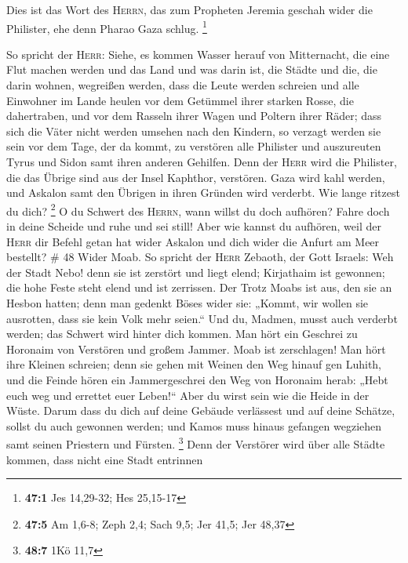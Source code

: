  Dies ist das Wort des \textsc{Herrn}, das zum Propheten
Jeremia geschah wider die Philister, ehe denn Pharao Gaza schlug.
\footnote{\textbf{47:1} Jes 14,29-32; Hes 25,15-17}

 So spricht der \textsc{Herr}: Siehe, es kommen Wasser
herauf von Mitternacht, die eine Flut machen werden und das Land und was
darin ist, die Städte und die, die darin wohnen, wegreißen werden, dass
die Leute werden schreien und alle Einwohner im Lande heulen
 vor dem Getümmel ihrer starken Rosse, die dahertraben,
und vor dem Rasseln ihrer Wagen und Poltern ihrer Räder; dass sich die
Väter nicht werden umsehen nach den Kindern, so verzagt werden sie sein
 vor dem Tage, der da kommt, zu verstören alle Philister
und auszureuten Tyrus und Sidon samt ihren anderen Gehilfen. Denn der
\textsc{Herr} wird die Philister, die das Übrige sind aus der Insel
Kaphthor, verstören.  Gaza wird kahl werden, und Askalon
samt den Übrigen in ihren Gründen wird verderbt. Wie lange ritzest du
dich? \footnote{\textbf{47:5} Am 1,6-8; Zeph 2,4; Sach 9,5; Jer 41,5;
  Jer 48,37}  O du Schwert des \textsc{Herrn}, wann willst
du doch aufhören? Fahre doch in deine Scheide und ruhe und sei still!
 Aber wie kannst du aufhören, weil der \textsc{Herr} dir
Befehl getan hat wider Askalon und dich wider die Anfurt am Meer
bestellt? \# 48  Wider Moab. So spricht der \textsc{Herr}
Zebaoth, der Gott Israels: Weh der Stadt Nebo! denn sie ist zerstört und
liegt elend; Kirjathaim ist gewonnen; die hohe Feste steht elend und ist
zerrissen.  Der Trotz Moabs ist aus, den sie an Hesbon
hatten; denn man gedenkt Böses wider sie: „Kommt, wir wollen sie
ausrotten, dass sie kein Volk mehr seien.`` Und du, Madmen, musst auch
verderbt werden; das Schwert wird hinter dich kommen.  Man
hört ein Geschrei zu Horonaim von Verstören und großem Jammer.
 Moab ist zerschlagen! Man hört ihre Kleinen schreien;
 denn sie gehen mit Weinen den Weg hinauf gen Luhith, und
die Feinde hören ein Jammergeschrei den Weg von Horonaim herab:
 „Hebt euch weg und errettet euer Leben!{}`` Aber du wirst
sein wie die Heide in der Wüste.  Darum dass du dich auf
deine Gebäude verlässest und auf deine Schätze, sollst du auch gewonnen
werden; und Kamos muss hinaus gefangen wegziehen samt seinen Priestern
und Fürsten. \footnote{\textbf{48:7} 1Kö 11,7}  Denn der
Verstörer wird über alle Städte kommen, dass nicht eine Stadt entrinnen
